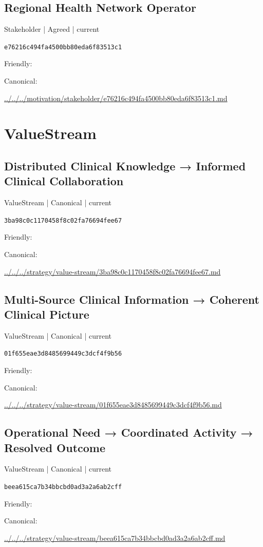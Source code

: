 \documentclass[10pt,a4paper]{article}
\begin{document}
\subsection*{Regional Health Network Operator}
{\small Stakeholder | Agreed | current}\par
\texttt{e76216c494fa4500bb80eda6f83513c1}\par
Friendly: \par
Canonical: \par
{\footnotesize\url{../../../motivation/stakeholder/e76216c494fa4500bb80eda6f83513c1.md}}\par
\section*{ValueStream}
\subsection*{Distributed Clinical Knowledge → Informed Clinical Collaboration}
{\small ValueStream | Canonical | current}\par
\texttt{3ba98c0c1170458f8c02fa76694fee67}\par
Friendly: \par
Canonical: \par
{\footnotesize\url{../../../strategy/value-stream/3ba98c0c1170458f8c02fa76694fee67.md}}\par
\subsection*{Multi-Source Clinical Information → Coherent Clinical Picture}
{\small ValueStream | Canonical | current}\par
\texttt{01f655eae3d8485699449c3dcf4f9b56}\par
Friendly: \par
Canonical: \par
{\footnotesize\url{../../../strategy/value-stream/01f655eae3d8485699449c3dcf4f9b56.md}}\par
\subsection*{Operational Need → Coordinated Activity → Resolved Outcome}
{\small ValueStream | Canonical | current}\par
\texttt{beea615ca7b34bbcbd0ad3a2a6ab2cff}\par
Friendly: \par
Canonical: \par
{\footnotesize\url{../../../strategy/value-stream/beea615ca7b34bbcbd0ad3a2a6ab2cff.md}}\par
\end{document}
